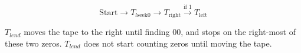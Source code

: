 $$\text{Start} \rightarrow T_{l\text{seek} 0} \rightarrow T_{\text{right}} \xrightarrow{\text{if 1}} T_{\text{left}}$$

$T_{lend}$ moves the tape to the right until finding $00$, and stops on the right-most of these two zeros. $T_{lend}$ does not start counting zeros until moving the tape.
